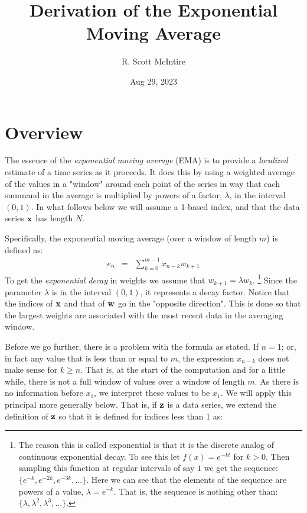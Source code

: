 \documentclass{article}
\title{Derivation of the Exponential Moving Average}
\author{R. Scott McIntire}
\date{Aug 29, 2023}
\begin{document}
\maketitle


\section{Overview}

The essence of the {\em exponential moving average\/} (EMA) is to provide 
a {\em localized\/} estimate of a time series as it proceeds. It does 
this by using a weighted average of the values in a "window" around each point 
of the series in way that each summand in 
the average is multiplied by powers of a factor, $\lambda$,
in the interval $(0,1)$.
In what follows below we will assume a 1-based index, and that 
the data series ${\bf x}$ has length $N$.

Specifically, the exponential moving average (over a window of length $m$) 
is defined as:
\begin{eqnarray}
    e_n &=& \sum_{k=0}^{m-1} x_{n-k} w_{k+1}  \label{ema_def}
\end{eqnarray}
To get the {\em exponential decay\/} in weights we assume that $w_{k+1} = \lambda w_k$.%
\footnote{The reason this is called exponential is that it is the discrete
analog of continuous exponential decay. To see this let $f(x) = e^{-kt}$ 
for $k > 0$. Then sampling this function at regular intervals of say $1$ 
we get the sequence: $\{ e^{-k}, e^{-2k}, e^{-3k}, \ldots \}$.
Here we can see that the elements of the sequence are powers of a value, $\lambda = e^{-k}$.
That is, the sequence is nothing other than: $\{\lambda, \lambda^2, \lambda^3, \ldots \}$.}
Since the parameter $\lambda$ is in the interval $(0,1)$, it represents a decay factor. 
Notice that the indices of ${\bf x}$ and that of ${\bf w}$ go in the "opposite direction".
This is done so that the largest weights are associated with the most recent data
in the averaging window.

Before we go further, there is a problem with the formula as stated.
If $n = 1$; or, in fact any value that is less than or equal to $m$,
the expression $x_{n-k}$ does not make sense for $k \ge n$. That is, at the 
start of the computation and for a little while, there is not a full window
of values over a window of length $m$. As there is no information before $x_1$,
we interpret these values to be $x_1$. 
We will apply this principal more generally below. 
That is, if ${\bf z}$ is a data series,
we extend the definition of ${\bf z}$ so that it is defined for
indices less than 1 as:
\end{document}
